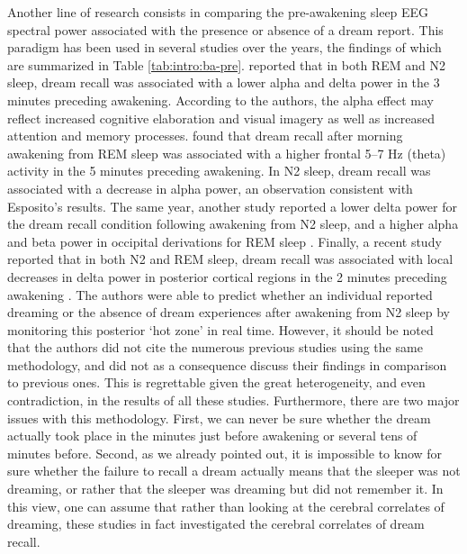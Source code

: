 Another line of research consists in comparing the pre-awakening sleep EEG spectral power associated with the presence or absence of a dream report. This paradigm has been used in several studies over the years, the findings of which are summarized in Table \ref{tab:intro:ba-pre}. \citet{esposito_reduced_2004} reported that in both REM and N2 sleep, dream recall was associated with a lower alpha and delta power in the 3 minutes preceding awakening. According to the authors, the alpha effect may reflect increased cognitive elaboration and visual imagery as well as increased attention and memory processes. \citet{marzano_recalling_2011} found that dream recall after morning awakening from REM sleep was associated with a higher frontal 5–7 Hz (theta) activity in the 5 minutes preceding awakening. In N2 sleep, dream recall was associated with a decrease in alpha power, an observation consistent with Esposito’s results. The same year, another study reported a lower delta power for the dream recall condition following awakening from N2 sleep, and a higher alpha and beta power in occipital derivations for REM sleep \citep{chellappa_cortical_2011}. Finally, a recent study reported that in both N2 and REM sleep, dream recall was associated with local decreases in delta power in posterior cortical regions in the 2 minutes preceding awakening \citep{siclari_neural_2017}. The authors were able to predict whether an individual reported dreaming or the absence of dream experiences after awakening from N2 sleep by monitoring this posterior ‘hot zone’ in real time. However, it should be noted that the authors did not cite the numerous previous studies using the same methodology, and did not as a consequence discuss their findings in comparison to previous ones. This is regrettable given the great heterogeneity, and even contradiction, in the results of all these studies. Furthermore, there are two major issues with this methodology. First, we can never be sure whether the dream actually took place in the minutes just before awakening or several tens of minutes before. Second, as we already pointed out, it is impossible to know for sure whether the failure to recall a dream actually means that the sleeper was not dreaming, or rather that the sleeper was dreaming but did not remember it. In this view, one can assume that rather than looking at the cerebral correlates of dreaming, these studies in fact investigated the cerebral correlates of dream recall.

